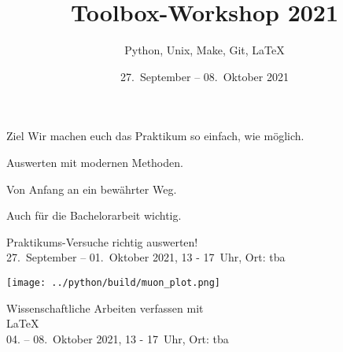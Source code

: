 

\title[Toolbox 2021]{Toolbox-Workshop 2021}
\subtitle{Python, Unix, Make, Git, \LaTeX{}}
\date{27.~September – 08.~Oktober 2021}
\author[Toolbox-Team]{}



\maketitle

\begin{frame}{Ziel}
  \setlength\parskip{3ex}
  \huge
  Wir machen euch das Praktikum so einfach, wie möglich.

  Auswerten mit modernen Methoden.

  Von Anfang an ein bewährter Weg.

  Auch für die Bachelorarbeit wichtig.
\end{frame}

\begin{frame}
  \vspace{2cm}
  \begin{center}
    \huge Praktikums-Versuche richtig auswerten!\\
    27.~September – 01.~Oktober 2021, 13 - 17~Uhr, Ort: tba
  \end{center}
\end{frame}

\begin{frame}[plain]
  \texttt{[image: ../python/build/muon\_plot.png]}
\end{frame}

\begin{frame}
  \begin{center}
    \huge Wissenschaftliche Arbeiten verfassen mit \\[0.5\baselineskip]
    \textrm{\fontsize{80}{120}\selectfont\LaTeX{}}\\[0.5\baselineskip]
    04. – 08.~Oktober 2021, 13 - 17~Uhr, Ort: tba
  \end{center}
\end{frame}

